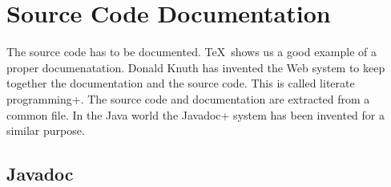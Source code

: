 \chapter{Source Code Documentation}


The source code has to be documented. \TeX\ shows us a good example of
a proper documenatation. Donald Knuth has invented
the Web system to keep together the documentation and the source code.
This is called \+literate programming+. The source code and
documentation are extracted from a common file. In the Java world the
\+Javadoc+ system has been invented for a similar purpose.


\section{Javadoc}


